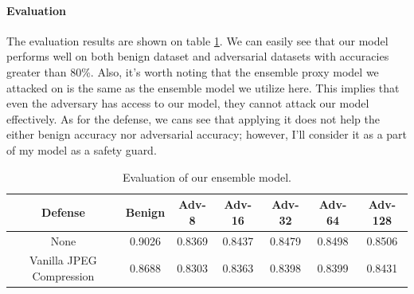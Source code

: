 \documentclass{article}
\begin{document}
\paragraph{Evaluation} The evaluation results are shown on table \ref{table:eval-ensemble-model}. We
can easily see that our model performs well on both benign dataset and adversarial datasets with
accuracies greater than 80\%. Also, it's worth noting that the ensemble proxy model we attacked on
is the same as the ensemble model we utilize here. This implies that even the adversary has access
to our model, they cannot attack our model effectively. As for the defense, we cans see that
applying it does not help the either benign accuracy nor adversarial accuracy; however, I'll
consider it as a part of my model as a safety guard.

\begin{table}[ht]
  \label{table:eval-ensemble-model}
  \centering
  \caption{Evaluation of our ensemble model.}
  \begin{tabular}{ccccccc}
    \toprule
    Defense                   & Benign  & Adv-8   & Adv-16  & Adv-32  & Adv-64  & Adv-128 \\
    \midrule
    None                      & 0.9026  & 0.8369  & 0.8437  & 0.8479  & 0.8498  & 0.8506  \\
    Vanilla JPEG Compression  & 0.8688  & 0.8303  & 0.8363  & 0.8398  & 0.8399  & 0.8431  \\
    \bottomrule
  \end{tabular}
\end{table}



\end{document}
